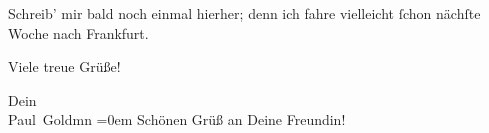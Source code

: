 \pstart
           Schreib’ mir bald noch einmal hierher; denn ich fahre vielleicht{ }ſchon nächſte Woche
               nach Frankfurt.\pend
           
\pstart
           Viele treue Grüße!\pend
           
\pstart
           Dein {\\[\baselineskip]}\spacefill\mbox{Paul Goldmn}\pend
           \leftskip=0em{}
\pstart
           \noindent{}Schönen Grüß an Deine Freundin!\pend
           \endnumbering{}  \newcommand{\dateiname}{L02841}\newcommand{\titel}{Paul Goldmann an Arthur Schnitzler, 7. 3. [1898]}\newcommand{\editorInnen}{Martin Anton Müller und Laura Untner}
